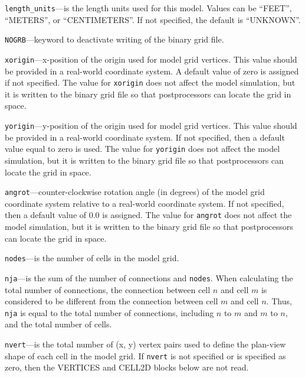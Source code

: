 
\item \texttt{length\_units}---is the length units used for this model.  Values can be ``FEET'', ``METERS'', or ``CENTIMETERS''.  If not specified, the default is ``UNKNOWN''.

\item \texttt{NOGRB}---keyword to deactivate writing of the binary grid file.

\item \texttt{xorigin}---x-position of the origin used for model grid vertices.  This value should be provided in a real-world coordinate system.  A default value of zero is assigned if not specified.  The value for \texttt{xorigin} does not affect the model simulation, but it is written to the binary grid file so that postprocessors can locate the grid in space.

\item \texttt{yorigin}---y-position of the origin used for model grid vertices.  This value should be provided in a real-world coordinate system.  If not specified, then a default value equal to zero is used.  The value for \texttt{yorigin} does not affect the model simulation, but it is written to the binary grid file so that postprocessors can locate the grid in space.

\item \texttt{angrot}---counter-clockwise rotation angle (in degrees) of the model grid coordinate system relative to a real-world coordinate system.  If not specified, then a default value of 0.0 is assigned.  The value for \texttt{angrot} does not affect the model simulation, but it is written to the binary grid file so that postprocessors can locate the grid in space.

\item \texttt{nodes}---is the number of cells in the model grid.

\item \texttt{nja}---is the sum of the number of connections and \texttt{nodes}.  When calculating the total number of connections, the connection between cell $n$ and cell $m$ is considered to be different from the connection between cell $m$ and cell $n$.  Thus, \texttt{nja} is equal to the total number of connections, including $n$ to $m$ and $m$ to $n$, and the total number of cells.

\item \texttt{nvert}---is the total number of (x, y) vertex pairs used to define the plan-view shape of each cell in the model grid.  If \texttt{nvert} is not specified or is specified as zero, then the VERTICES and CELL2D blocks below are not read.

